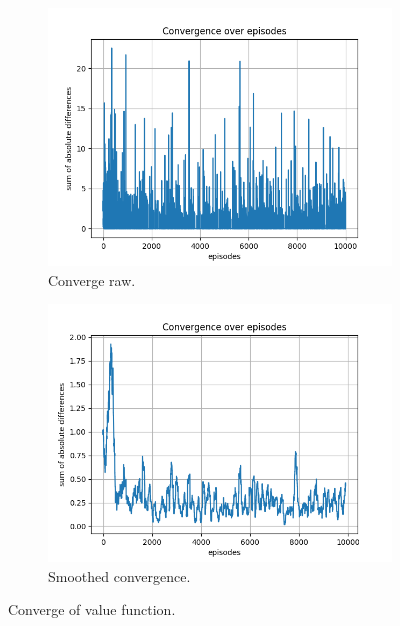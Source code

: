 \documentclass{assignment}
\begin{document}
\begin{figure}[H]
    \begin{subfigure}{0.5\textwidth}
        \includegraphics[width=\textwidth]{figures/convergence_q/gamma_sweep/convergence_Q_alpha_0.1_gamma_0.25_epislon_0.2.png}
    \caption{Converge raw.}
    \end{subfigure}\hfill
    \begin{subfigure}{0.5\textwidth}
        \includegraphics[width=\textwidth]{figures/convergence_q/gamma_sweep/convergence_Q_smoothed_alpha_0.1_gamma_0.25_epislon_0.2.png}
    \caption{Smoothed convergence.}
    \end{subfigure}
    \caption{Converge of value function.}
    \label{fig:gamma_0.25_q_learning_convergence}
\end{figure}
\end{document}
